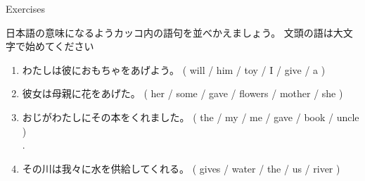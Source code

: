 \documentclass[aspectratio=169,xcolor={dvipsnames,table}]{beamer}
\begin{document}
\begin{frame}[plain]{Exercises}

{\small 日本語の意味になるようカッコ内の語句を並べかえましょう。
文頭の語は大文字で始めてください}%
\mbox{}\hfill{\scriptsize {}}

 \begin{enumerate}
  \item {\small わたしは彼におもちゃをあげよう。} ( will / him / toy / I / give / a )\\
  \item {\small 彼女は母親に花をあげた。} ( her / some / gave / flowers / mother / she )\\
  \item {\small おじがわたしにその本をくれました。} ( the / my / me / gave / book / uncle )\\
.
  \item {\small その川は我々に水を供給してくれる。} ( gives / water / the / us / river )\\
 \end{enumerate}
\end{frame}
\end{document}
